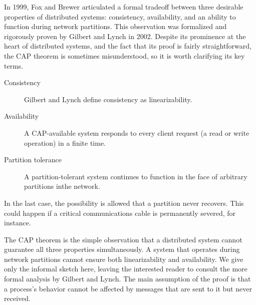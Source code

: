 \documentclass[]             %
{NASA}                       %
\theoremstyle{definition}
\begin{document}
In 1999, Fox and Brewer \cite{1999foxbrewer} articulated a formal
tradeoff between three desirable properties of distributed systems:
consistency, availability, and an ability to function during network
partitions. This observation was formalized and rigorously proven by
Gilbert and Lynch \cite{2002gilbertlynchCAP} in 2002. Despite its
prominence at the heart of distributed systems, and the fact that its
proof is fairly straightforward, the CAP theorem is sometimes
misunderstood, so it is worth clarifying its key terms.

\begin{description}
\item[Consistency] Gilbert and Lynch define consistency as
  linearizability.
\item[Availability] A CAP-available system responds to every client
  request (a read or write operation) in a finite time.
\item[Partition tolerance] A partition-tolerant system continues to
  function in the face of arbitrary partitions inthe network.
\end{description}

In the last case, the possibility is allowed that a partition never
recovers. This could happen if a critical communications cable is
permanently severed, for instance.

The CAP theorem is the simple observation that a distributed system
cannot guarantee all three properties simultaneously. A system that
operates during network partitions cannot ensure both linearizability
and availability. We give only the informal sketch here, leaving the
interested reader to consult the more formal analysis by Gilbert and
Lynch. The main assumption of the proof is that a process's behavior
cannot be affected by messages that are sent to it but never received.
\end{document}

